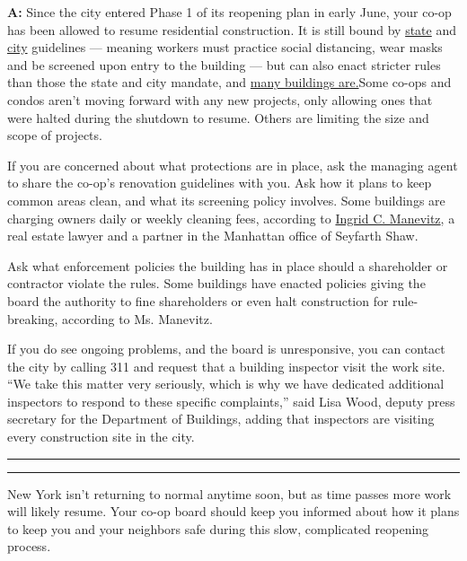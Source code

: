 \textbf{A:} Since the city entered Phase 1 of its reopening plan in
early June, your co-op has been allowed to resume residential
construction. It is still bound by
\href{https://www.governor.ny.gov/sites/governor.ny.gov/files/atoms/files/ConstructionShortGuidelines.pdf}{state}
and
\href{https://www1.nyc.gov/assets/buildings/pdf/restart_enforcement_guidance.pdf}{city}
guidelines --- meaning workers must practice social distancing, wear
masks and be screened upon entry to the building --- but can also enact
stricter rules than those the state and city mandate, and
\href{https://www.nytimes.com/2020/07/02/realestate/coronavirus-home-renovations.html}{many
buildings are.}Some co-ops and condos aren't moving forward with any new
projects, only allowing ones that were halted during the shutdown to
resume. Others are limiting the size and scope of projects.

If you are concerned about what protections are in place, ask the
managing agent to share the co-op's renovation guidelines with you. Ask
how it plans to keep common areas clean, and what its screening policy
involves. Some buildings are charging owners daily or weekly cleaning
fees, according to
\href{https://www.seyfarth.com/people/ingrid-c-manevitz.html}{Ingrid C.
Manevitz}, a real estate lawyer and a partner in the Manhattan office of
Seyfarth Shaw.

Ask what enforcement policies the building has in place should a
shareholder or contractor violate the rules. Some buildings have enacted
policies giving the board the authority to fine shareholders or even
halt construction for rule-breaking, according to Ms. Manevitz.

If you do see ongoing problems, and the board is unresponsive, you can
contact the city by calling 311 and request that a building inspector
visit the work site. ``We take this matter very seriously, which is why
we have dedicated additional inspectors to respond to these specific
complaints,'' said Lisa Wood, deputy press secretary for the Department
of Buildings, adding that inspectors are visiting every construction
site in the city.

\begin{center}\rule{0.5\linewidth}{\linethickness}\end{center}

\begin{center}\rule{0.5\linewidth}{\linethickness}\end{center}

New York isn't returning to normal anytime soon, but as time passes more
work will likely resume. Your co-op board should keep you informed about
how it plans to keep you and your neighbors safe during this slow,
complicated reopening process.

